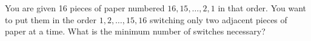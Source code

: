 You are given 16 pieces of paper numbered $16, 15, \ldots , 2, 1$ in that order. You want to put them in the order $1, 2, \ldots , 15, 16$ switching only two adjacent pieces of paper at a time. What is the minimum number of switches necessary?